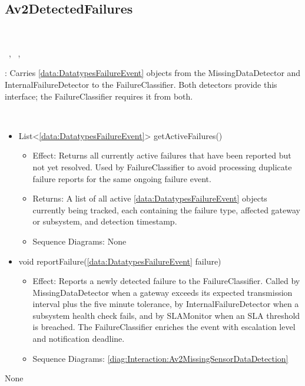   \subsection{Av2DetectedFailures}\label{int:InterfacesAv2DetectedFailures}
    \begin{description}
      \item[Provided by:] \iconcomponent{}~
      \item[Required by:] \iconcomponent{}~, \iconcomponent{}~, \iconcomponent{}~ 
           \item[Description]: Carries \ref{data:DatatypesFailureEvent} objects from the MissingDataDetector and InternalFailureDetector to the FailureClassifier. Both detectors provide this interface; the FailureClassifier requires it from both.
      \item[Operations:] ~
    \begin{itemize}[noitemsep,nolistsep,leftmargin=-.25cm]
      \item \textsf{List\textless{}\ref{data:DatatypesFailureEvent}\textgreater{} getActiveFailures()}
        \begin{itemize}[noitemsep,nolistsep]
           \item Effect: Returns all currently active failures that have been reported but not yet resolved. Used by FailureClassifier to avoid processing duplicate failure reports for the same ongoing failure event. 
           \item Returns: A list of all active \ref{data:DatatypesFailureEvent} objects currently being tracked, each containing the failure type, affected gateway or subsystem, and detection timestamp.
           \item Sequence Diagrams: None
        \end{itemize}
      \item \textsf{void reportFailure(\ref{data:DatatypesFailureEvent} failure)}
        \begin{itemize}[noitemsep,nolistsep]
           \item Effect: Reports a newly detected failure to the FailureClassifier. Called by MissingDataDetector when a gateway exceeds its expected transmission interval plus the five minute tolerance, by InternalFailureDetector when a subsystem health check fails, and by SLAMonitor when an SLA threshold is breached. The FailureClassifier enriches the event with escalation level and notification deadline. 
           \item Sequence Diagrams: \cref{diag:Interaction:Av2MissingSensorDataDetection}
        \end{itemize}
    \end{itemize}
      \item[Diagrams:] None
    \end{description}

